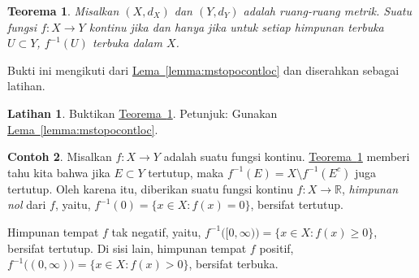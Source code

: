 \documentclass[12pt,openany]{book}
\newcommand{\R}{{\mathbb{R}}}
\newcommand{\myindex}[1]{#1\index{#1}}
\theoremstyle{plain}
\newtheorem{thm}{Teorema}[section]
\theoremstyle{remark}
\theoremstyle{definition}
\newenvironment{exbox}{%
    \def\FrameCommand{\vrule width 1pt \relax\hspace{10pt}}%
    \MakeFramed{\advance\hsize-\width\FrameRestore}%
}{%
    \endMakeFramed
}
\theoremstyle{exercise}
\newtheorem{exercise}{Latihan}[section]
\theoremstyle{example}
\newtheorem{example}[thm]{Contoh}
\newcommand{\thmref}[1]{\hyperref[#1]{Teorema~\ref*{#1}}}
\newcommand{\lemmaref}[1]{\hyperref[#1]{Lema~\ref*{#1}}}
\begin{document}
\begin{thm} \label{thm:mstopocont}
Misalkan $(X,d_X)$ dan $(Y,d_Y)$ adalah ruang-ruang metrik.  Suatu fungsi $f \colon X \to Y$
kontinu jika dan hanya jika
untuk setiap himpunan terbuka $U \subset Y$, $f^{-1}(U)$ terbuka dalam $X$.
\end{thm}

Bukti ini mengikuti dari \lemmaref{lemma:mstopocontloc} dan diserahkan sebagai
latihan.

\begin{exbox}
\begin{exercise}
Buktikan \thmref{thm:mstopocont}.  Petunjuk: Gunakan \lemmaref{lemma:mstopocontloc}.
\end{exercise}
\end{exbox}


\begin{example}
Misalkan $f \colon X \to Y$ adalah suatu fungsi kontinu.
\thmref{thm:mstopocont} memberi tahu kita bahwa jika $E \subset Y$ tertutup, maka 
$f^{-1}(E) = X \setminus f^{-1}(E^c)$ juga tertutup.  Oleh karena itu,
diberikan
suatu fungsi kontinu $f \colon X \to \R$, 
\emph{\myindex{himpunan nol}} dari $f$, yaitu, 
$f^{-1}(0) = \{ x \in X :
f(x) = 0 \}$, bersifat tertutup.

Himpunan tempat $f$ tak negatif, yaitu,
$f^{-1}\bigl( [0,\infty) \bigr) = \{ x \in X :
f(x) \geq 0 \}$, bersifat tertutup.  Di sisi lain,
himpunan tempat $f$ positif,
$f^{-1}\bigl( (0,\infty) \bigr) = \{ x \in X :
f(x) > 0 \}$, bersifat terbuka.  
\end{example}
\end{document}
